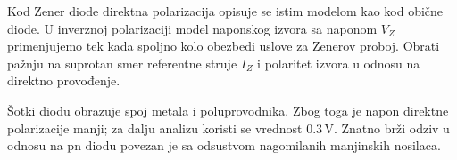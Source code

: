 Kod Zener diode direktna polarizacija opisuje se istim modelom kao kod obične diode. U inverznoj polarizaciji model naponskog izvora sa naponom $V_Z$ primenjujemo tek kada spoljno kolo obezbedi uslove za Zenerov proboj. Obrati pažnju na suprotan smer referentne struje $I_Z$ i polaritet izvora u odnosu na direktno provođenje.

Šotki diodu obrazuje spoj metala i poluprovodnika. Zbog toga je napon direktne polarizacije manji; za dalju analizu koristi se vrednost $0.3\,\mathrm{V}$. Znatno brži odziv u odnosu na pn diodu povezan je sa odsustvom nagomilanih manjinskih nosilaca.
